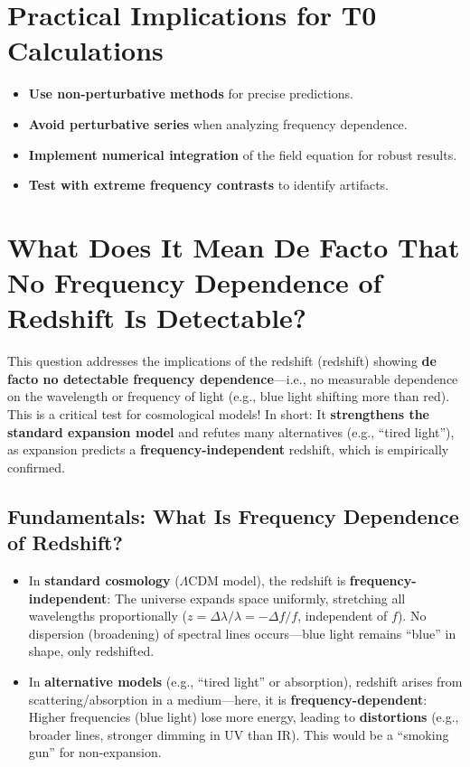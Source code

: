 	\section{Practical Implications for T0 Calculations}
	
	\begin{itemize}
		\item \textbf{Use non-perturbative methods} for precise predictions.
		\item \textbf{Avoid perturbative series} when analyzing frequency dependence.
		\item \textbf{Implement numerical integration} of the field equation for robust results.
		\item \textbf{Test with extreme frequency contrasts} to identify artifacts.
	\end{itemize}
	
	\section{What Does It Mean De Facto That No Frequency Dependence of Redshift Is Detectable?}
	
	This question addresses the implications of the redshift (redshift) showing \textbf{de facto no detectable frequency dependence}—i.e., no measurable dependence on the wavelength or frequency of light (e.g., blue light shifting more than red). This is a critical test for cosmological models! In short: It \textbf{strengthens the standard expansion model} and refutes many alternatives (e.g., ``tired light''), as expansion predicts a \textbf{frequency-independent} redshift, which is empirically confirmed.
	
	\subsection{Fundamentals: What Is Frequency Dependence of Redshift?}
	
	\begin{itemize}
		\item In \textbf{standard cosmology} ($\Lambda$CDM model), the redshift is \textbf{frequency-independent}: The universe expands space uniformly, stretching all wavelengths proportionally ($z = \Delta\lambda/\lambda = -\Delta f/f$, independent of $f$). No dispersion (broadening) of spectral lines occurs—blue light remains ``blue'' in shape, only redshifted.
		\item In \textbf{alternative models} (e.g., ``tired light'' or absorption), redshift arises from scattering/absorption in a medium—here, it is \textbf{frequency-dependent}: Higher frequencies (blue light) lose more energy, leading to \textbf{distortions} (e.g., broader lines, stronger dimming in UV than IR). This would be a ``smoking gun'' for non-expansion.
	\end{itemize}
	

